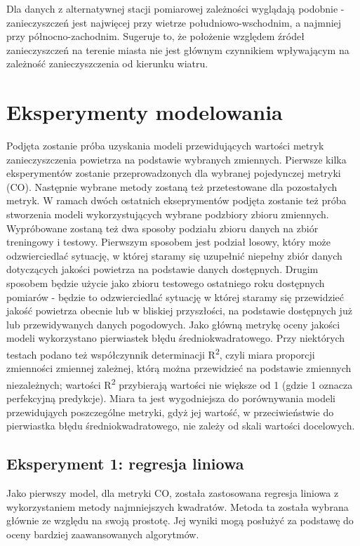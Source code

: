\documentclass[18pt, letterpaper]{article}
\begin{document}
Dla danych z alternatywnej stacji pomiarowej zależności wyglądają podobnie - zanieczyszczeń jest najwięcej przy wietrze południowo-wschodnim, a najmniej przy północno-zachodnim. Sugeruje to, że położenie względem źródeł zanieczyszczeń na terenie miasta nie jest głównym czynnikiem wpływającym na zależność zanieczyszczenia od kierunku wiatru.

\section{Eksperymenty modelowania}

Podjęta zostanie próba uzyskania modeli przewidujących wartości metryk zanieczyszczenia powietrza na podstawie wybranych zmiennych. Pierwsze kilka eksperymentów zostanie przeprowadzonych dla wybranej pojedynczej metryki (CO). Następnie wybrane metody zostaną też przetestowane dla pozostałych metryk. W ramach dwóch ostatnich ekseprymentów podjęta zostanie też próba stworzenia modeli wykorzystujących wybrane podzbiory zbioru zmiennych. Wypróbowane zostaną też dwa sposoby podziału zbioru danych na zbiór treningowy i testowy. Pierwszym sposobem jest podział losowy, który może odzwierciedlać sytuację, w której staramy się uzupełnić niepełny zbiór danych dotyczących jakości powietrza na podstawie danych dostępnych. Drugim sposobem będzie użycie jako zbioru testowego ostatniego roku dostępnych pomiarów - będzie to odzwierciedlać sytuację w której staramy się przewidzieć jakość powietrza obecnie lub w bliskiej przyszłości, na podstawie dostępnych już lub przewidywanych danych pogodowych. 
Jako główną metrykę oceny jakości modeli wykorzystano pierwiastek błędu średniokwadratowego. Przy niektórych testach podano też współczynnik determinacji R\textsuperscript{2}, czyli miara proporcji zmienności zmiennej zależnej, którą można przewidzieć na podstawie zmiennych niezależnych; wartości R\textsuperscript{2} przybierają wartości nie większe od 1 (gdzie 1 oznacza perfekcyjną predykcje). Miara ta jest wygodniejsza do porównywania modeli przewidująych poszczególne metryki, gdyż jej wartość, w przeciwieństwie do pierwiastka błędu średniokwadratowego, nie zależy od skali wartości docelowych.

\subsection{Eksperyment 1: regresja liniowa}

Jako pierwszy model, dla metryki CO, została zastosowana regresja liniowa z wykorzystaniem metody najmniejszych kwadratów. Metoda ta została wybrana głównie ze względu na swoją prostotę. Jej wyniki mogą posłużyć za podstawę do oceny bardziej zaawansowanych algorytmów.
\end{document}

